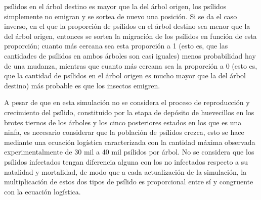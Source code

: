 psílidos en el árbol destino es mayor que la del árbol origen, los psílidos simplemente no emigran y se sortea de nuevo una posición. Si se da el caso inverso, en el que la proporción de psílidos en el árbol destino sea menor que la del árbol origen, entonces se sortea la migración de los psílidos en función de esta proporción; cuanto más cercana sea esta proporción a 1 (esto es, que las cantidades de psílidos en ambos árboles son casi iguales) menos probabilidad hay de una mudanza, mientras que cuanto más cercana sea la proporción a 0 (esto es, que la cantidad de psílidos en el árbol origen es mucho mayor que la del árbol destino) más probable es que los insectos emigren.


A pesar de que en esta simulación no se considera el proceso de reproducción y crecimiento del psílido, constituido por la etapa de depósito de huevecillos en los brotes tiernos de los árboles y los cinco posteriores estados en los que es una ninfa, es necesario considerar que la población de psílidos crezca, esto se hace mediante una ecuación logística caracterizada con la cantidad máxima observada experimentalmente de 30 mil a 40 mil psílidos por árbol. No se considera que los psílidos infectados tengan diferencia alguna con los no infectados respecto a su natalidad y mortalidad, de modo que a cada actualización de la simulación, la multiplicación de estos dos tipos de psílido es proporcional entre sí y congruente con la ecuación logística.

